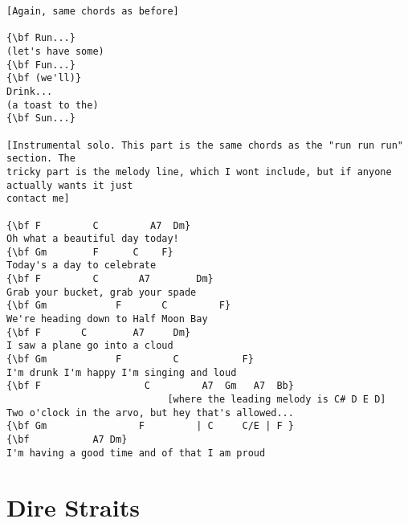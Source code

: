 \documentclass[a4paper]{article}
\begin{document}
\begin{Verbatim}[commandchars=\\\{\}]
[Again, same chords as before]

{\bf Run...}
(let's have some)
{\bf Fun...}
{\bf (we'll)}
Drink...
(a toast to the)
{\bf Sun...}

[Instrumental solo. This part is the same chords as the "run run run" section. The 
tricky part is the melody line, which I wont include, but if anyone actually wants it just 
contact me]

{\bf F         C         A7  Dm}
Oh what a beautiful day today!
{\bf Gm        F      C    F}
Today's a day to celebrate
{\bf F         C       A7        Dm}
Grab your bucket, grab your spade
{\bf Gm            F       C         F}
We're heading down to Half Moon Bay
{\bf F       C        A7     Dm}
I saw a plane go into a cloud
{\bf Gm            F         C           F}
I'm drunk I'm happy I'm singing and loud
{\bf F                  C         A7  Gm   A7  Bb}
                            [where the leading melody is C# D E D]
Two o'clock in the arvo, but hey that's allowed...
{\bf Gm                F         | C     C/E | F }
{\bf           A7 Dm}
I'm having a good time and of that I am proud

\end{Verbatim}
\newpage
\section{Dire Straits}
\end{document}
